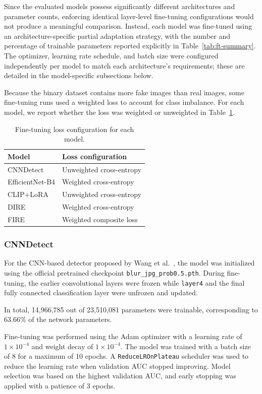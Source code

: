 Since the evaluated models possess significantly different architectures and parameter counts, enforcing identical layer-level fine-tuning configurations would not produce a meaningful comparison. Instead, each model was fine-tuned using an architecture-specific partial adaptation strategy, with the number and percentage of trainable parameters reported explicitly in Table~\ref{tab:ft-summary}. The optimizer, learning rate schedule, and batch size were configured independently per model to match each architecture's requirements; these are detailed in the model-specific subsections below.

Because the binary dataset contains more fake images than real images, some fine-tuning runs used a weighted loss to account for class imbalance. For each model, we report whether the loss was weighted or unweighted in Table~\ref{tab:finetuning-loss-config}.

\begin{table}[t]
\centering
\caption{Fine-tuning loss configuration for each model.}
\label{tab:finetuning-loss-config}
\begin{tabular}{l l}
\hline
Model & Loss configuration \\
\hline
CNNDetect & Unweighted cross-entropy \\
EfficientNet-B4 & Weighted cross-entropy \\
CLIP+LoRA & Unweighted cross-entropy \\
DIRE & Weighted cross-entropy \\
FIRE & Weighted composite loss \\
\hline
\end{tabular}
\end{table}

\subsubsection{CNNDetect}
\label{subsubsec:cnndetect-ft}
For the CNN-based detector proposed by Wang et al.~\cite{wang2020cnndetect}, the model was initialized using the official pretrained checkpoint \texttt{blur\_jpg\_prob0.5.pth}. During fine-tuning, the earlier convolutional layers were frozen while \texttt{layer4} and the final fully connected classification layer were unfrozen and updated.

In total, 14,966,785 out of 23,510,081 parameters were trainable, corresponding to 63.66\% of the network parameters.

Fine-tuning was performed using the Adam optimizer with a learning rate of $1\times10^{-4}$ and weight decay of $1\times10^{-4}$. The model was trained with a batch size of 8 for a maximum of 10 epochs. A \texttt{ReduceLROnPlateau} scheduler was used to reduce the learning rate when validation AUC stopped improving. Model selection was based on the highest validation AUC, and early stopping was applied with a patience of 3 epochs.

